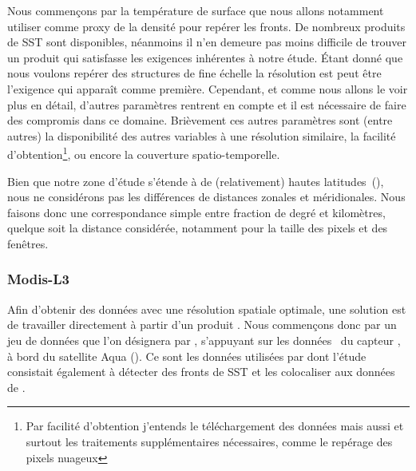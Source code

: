 Nous commençons par la température de surface que nous allons notamment utiliser comme proxy de la densité pour repérer les fronts.
De nombreux produits de SST sont disponibles, néanmoins il n'en demeure pas moins difficile de trouver un produit qui satisfasse les exigences inhérentes à notre étude.
Étant donné que nous voulons repérer des structures de fine échelle la résolution est peut être l’exigence qui apparaît comme première.
Cependant, et comme nous allons le voir plus en détail, d'autres paramètres rentrent en compte et il est nécessaire de faire des compromis dans ce domaine.
Brièvement ces autres paramètres sont (entre autres) la disponibilité des autres variables à une résolution similaire, la facilité d'obtention\footnote{%
  Par facilité d'obtention j'entends le téléchargement des données mais aussi et surtout les traitements supplémentaires nécessaires, comme le repérage des pixels nuageux },
ou encore la couverture spatio-temporelle.

\begin{note}[label={note:approx-lat-km}]
  Bien que notre zone d'étude s'étende à de (relativement) hautes latitudes~(\tapprox{}), nous ne considérons pas les différences de distances zonales et méridionales.
  Nous faisons donc une correspondance simple entre fraction de degré et kilomètres, quelque soit la distance considérée, notamment pour la taille des pixels et des fenêtres.
\end{note}

\subsubsection{Modis-L3}

Afin d'obtenir des données avec une résolution spatiale optimale, une solution est de travailler directement à partir d'un produit .
Nous commençons donc par un jeu de données que l'on désignera par , s'appuyant sur les données~ du capteur , à bord du satellite Aqua (\cite{kilpatrick_2015}).
Ce sont les données utilisées par \textcite{liu_2016}  dont l'étude consistait également à détecter des fronts de SST et les colocaliser aux données de .

